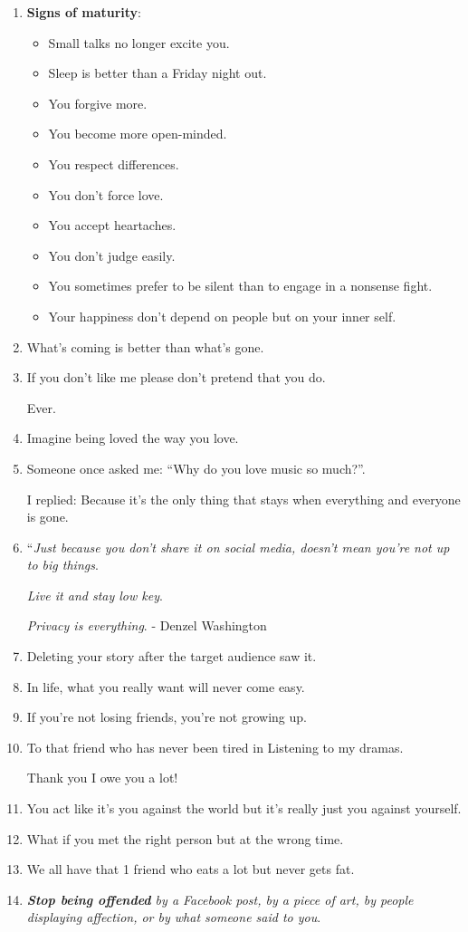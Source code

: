 \documentclass{article}
\numberwithin{equation}{section}
\begin{document}
\begin{enumerate}
    Religion: Love
    \item \textbf{Signs of maturity}:
    \begin{itemize}
        \item[1.] Small talks no longer excite you.
        \item[2.] Sleep is better than a Friday night out.
        \item[3.] You forgive more.
        \item[4.] You become more open-minded.
        \item[5.] You respect differences.
        \item[6.] You don't force love.
        \item[7.] You accept heartaches.
        \item[8.] You don't judge easily.
        \item[9.] You sometimes prefer to be silent than to engage in a nonsense fight.
        \item[10.] Your happiness don't depend on people but on your inner self.
    \end{itemize}
    \item What's coming is better than what's gone.
    \item If you don't like me please don't pretend that you do.
    
    Ever.
    \item Imagine being loved the way you love.
    \item Someone once asked me: ``Why do you love music so much?''.
    
    I replied: Because it's the only thing that stays when everything and everyone is gone.
    \item ``\textit{Just because you don't share it on social media, doesn't mean you're not up to big things}.
    
    \textit{Live it and stay low key}.
    
    \textit{Privacy is everything}. - Denzel Washington
    \item Deleting your story after the target audience saw it.
    \item In life, what you really want will never come easy.
    \item If you're not losing friends, you're not growing up.
    \item To that friend who has never been tired in Listening to my dramas.
    
    Thank you I owe you a lot!
    \item You act like it's you against the world but it's really just you against yourself.
    \item What if you met the right person but at the wrong time.
    \item We all have that 1 friend who eats a lot but never gets fat.
    \item \textit{\textbf{Stop being offended} by a Facebook post, by a piece of art, by people displaying affection, or by what someone said to you}.
    

\end{enumerate}
\end{document}
